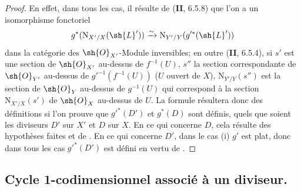 \begin{proof}
En effet, dans tous les cas, il résulte de (\textbf{II}, 6.5.8) que l'on a un isomorphisme fonctoriel
\[
  g^*(\mathrm{N}_{X'/X}(\sh{L}'))\xrightarrow{\sim}\mathrm{N}_{Y'/Y}(g'^*(\sh{L}'))
\]
dans la catégorie des $\sh{O}_{X'}$-Module inversibles;
en outre (\textbf{II}, 6.5.4), si $s'$ est une section de $\sh{O}_{X'}$ au-dessus de $f^{-1}(U)$, $s''$ la section correspondante de $\sh{O}_{Y'}$ au-dessus de $g'^{-1}(f^{-1}(U))$ ($U$ ouvert de $X$), $\mathrm{N}_{Y'/Y}(s'')$ est la section de $\sh{O}_Y$ au-dessus de $g^{-1}(U)$ qui correspond à la section $\mathrm{N}_{X'/X}(s')$ de $\sh{O}_X$ au-dessus de $U$.
La formule  résultera donc des définitions si l'on prouve que $g'^*(D')$ et $g^*(D)$ sont définis, quels que soient les diviseurs $D'$ sur $X'$ et $D$ sur $X$.
En ce qui concerne $D$, cela résulte des hypothèses faites et de .
En ce qui concerne $D'$, dans le cas (i) $g'$ est plat, donc dans tous les cas $g'^*(D')$ est défini en vertu de .
\end{proof}

\subsection{Cycle 1-codimensionnel associé à un diviseur.}
\label{IV.21.6}

